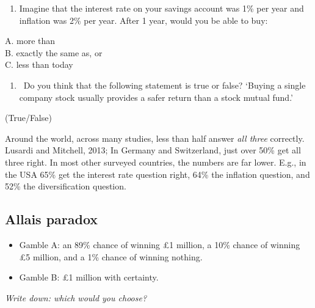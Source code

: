 \documentclass[]{article}
\providecommand{\tightlist}{%
  \setlength{\itemsep}{0pt}\setlength{\parskip}{0pt}}
\begin{document}
\bigskip

\begin{enumerate}
\def\labelenumi{\arabic{enumi}.}
\setcounter{enumi}{1}
\tightlist
\item
  Imagine that the interest rate on your savings account was 1\% per
  year and inflation was 2\% per year. After 1 year, would you be able
  to buy:
\end{enumerate}

A. more than\\

B. exactly the same as, or~\\

C. less than today~

\bigskip

\begin{enumerate}
\def\labelenumi{\arabic{enumi}.}
\setcounter{enumi}{2}
\tightlist
\item
  ~Do you think that the following statement is true or false? `Buying a
  single company stock usually provides a safer return than a stock
  mutual fund.'~
\end{enumerate}

(True/False)

\medskip

Around the world, across many studies, less than half answer \emph{all
three} correctly. Lusardi and Mitchell, 2013; In Germany and
Switzerland, just over 50\% get all three right. In most other surveyed
countries, the numbers are far lower. E.g., in the USA 65\% get the
interest rate question right, 64\% the inflation question, and 52\% the
diversification question.

\hypertarget{allais-paradox}{%
\subsection{Allais paradox}\label{allais-paradox}}

\begin{itemize}
\tightlist
\item
  Gamble A: an 89\% chance of winning \pounds1 million, a 10\% chance of
  winning \pounds5 million, and a 1\% chance of winning nothing.
\item
  Gamble B: \pounds1 million with certainty.
\end{itemize}

\bigskip

\emph{Write down: which would you choose?}

\hrulefill
\end{document}
